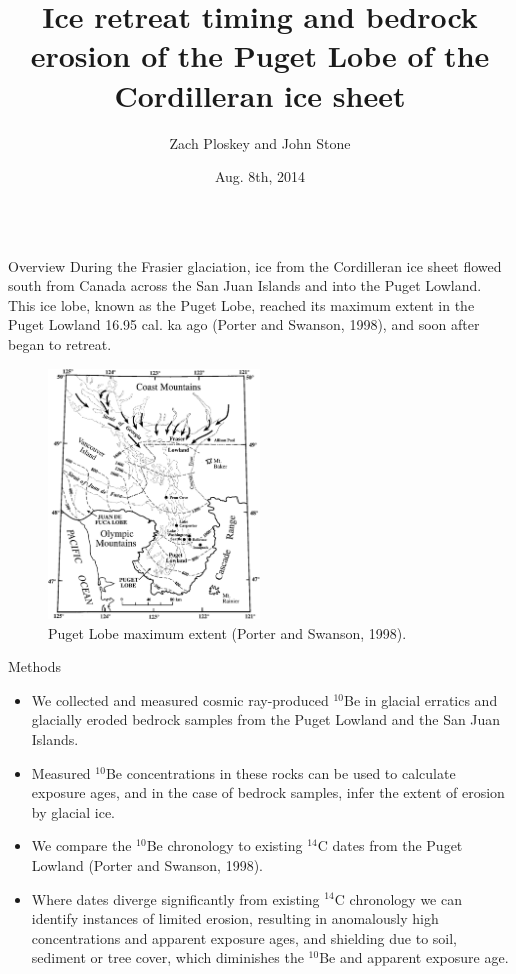 \documentclass{beamer}
\title{Ice retreat timing and bedrock erosion of the Puget Lobe of the Cordilleran ice sheet}
\author{Zach Ploskey and John Stone}
\institute{Cosmogenic Nuclide Lab, Dept. of Earth and Space Sciences, University of Washington, Seattle}
\date{Aug. 8th, 2014}
\begin{document}
\begin{frame}{}\centering

\begin{columns}[T]

\begin{column}{0.32\columnwidth}

\begin{block}{Overview}	
During the Frasier glaciation, ice from the Cordilleran ice sheet flowed south from Canada across the San Juan Islands and into the Puget Lowland.
This ice lobe, known as the Puget Lobe, reached its maximum extent in the Puget Lowland 16.95 cal. ka ago  (Porter and Swanson, 1998), and soon after began to retreat.

\begin{figure}
\includegraphics[width=0.5\textwidth]{lobe_map.png}
\caption*{Puget Lobe maximum extent (Porter and Swanson, 1998).}
\end{figure}

\end{block}

\begin{block}{Methods}
\begin{itemize}
\item We collected and measured cosmic ray-produced $^{10}$Be in glacial erratics and glacially eroded bedrock samples from the Puget Lowland and the San Juan Islands.
\item Measured $^{10}$Be concentrations in these rocks can be used to calculate exposure ages, and in the case of bedrock samples, infer the extent of erosion by glacial ice.
\item We compare the $^{10}$Be chronology to existing $^{14}$C dates from the Puget Lowland (Porter and Swanson, 1998).
\item Where dates diverge significantly from existing $^{14}$C chronology we can identify instances of limited erosion, resulting in anomalously high concentrations and apparent exposure ages, and shielding due to soil, sediment or tree cover, which diminishes the $^{10}$Be and apparent exposure age.
\end{itemize}
\end{block}


\end{column}
\end{columns}
\end{frame}
\end{document}
